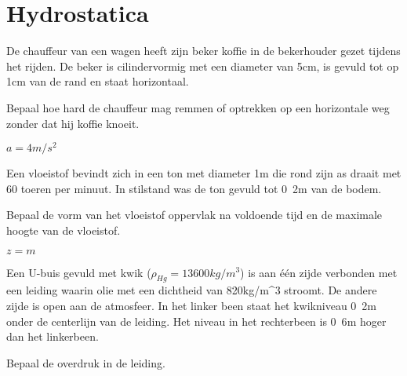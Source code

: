 \chapter{Hydrostatica}
\label{sec:Hydrostatica}
	\begin{toepassing}
		\label{koffie}
De chauffeur van een wagen heeft zijn beker koffie in de bekerhouder gezet tijdens het rijden. De beker is cilindervormig met een diameter van \unit{5}{cm}, is gevuld tot op \unit{1}{cm} van de rand en staat horizontaal.
		
Bepaal hoe hard de chauffeur mag remmen of optrekken op een horizontale weg zonder dat hij koffie knoeit.
	\end{toepassing}
	\begin{antwoord}
		$a = \unit{4}{m/s^2}$
	\end{antwoord}
	\begin{toepassing}
		\label{rotatiegieten}
Een vloeistof bevindt zich in een ton met diameter \unit{1}{m} die rond zijn as draait met 60 toeren per minuut. In stilstand was de ton gevuld tot \unit{0.2}{m} van de bodem. 
		
Bepaal de vorm van het vloeistof oppervlak na voldoende tijd en de maximale hoogte van de vloeistof.
		\begin{center}
			
		\end{center}
	\end{toepassing}
	\begin{antwoord}
		$z = \unit{}{m}$ 
	\end{antwoord}
	\begin{toepassing}
		\label{u-buis}
Een U-buis gevuld met kwik ($\rho_{Hg}=\unit{13600}{kg/m^3}$) is aan \'e\'en zijde verbonden met een leiding waarin olie met een dichtheid van \unit{820}{kg/m^3} stroomt. De andere zijde is open aan de atmosfeer. In het linker been staat het kwikniveau \unit{0.2}{m} onder de centerlijn van de leiding. Het niveau in het rechterbeen is \unit{0.6}{m} hoger dan het linkerbeen.
		
Bepaal de overdruk in de leiding.
	\end{toepassing}
